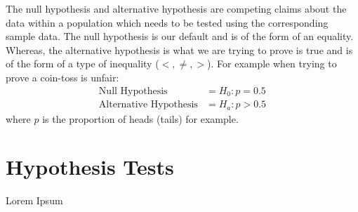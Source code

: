 \documentclass[12pt]{article}
\begin{document}
\begin{tcolorbox}[title=Null \& Alternative Hypotheses]
    The null hypothesis and alternative hypothesis are competing claims about the data within a population which needs to be tested using the corresponding sample data. The null hypothesis is our default and is of the form of an equality. Whereas, the alternative hypothesis is what we are trying to prove is true and is of the form of a type of inequality ($<, \ne, >$). For example when trying to prove a coin-toss is unfair:
    \begin{align*}
        \text{Null Hypothesis} &= H_0 : p=0.5\\
        \text{Alternative Hypothesis} &= H_a : p>0.5
    \end{align*}
    where $p$ is the proportion of heads (tails) for example.
\end{tcolorbox}


\pagebreak
\section{Hypothesis Tests}
Lorem Ipsum \\

\end{document}
